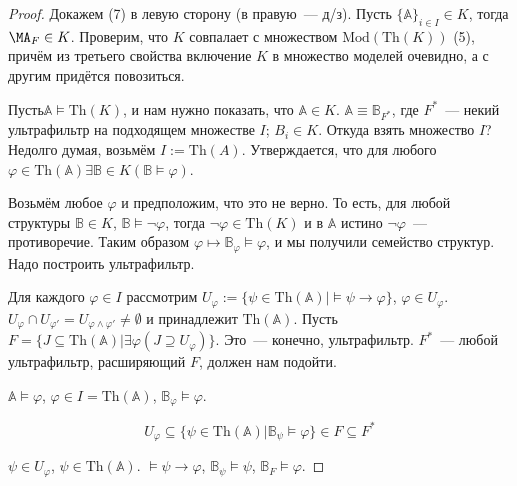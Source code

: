 \begin{proof}
    Докажем (7) в левую сторону (в правую~— д/з). Пусть $\{\mathbb{A}\}_{i \in I} \in K$, тогда $\MA_F \in K$. Проверим, что $K$ совпалает с множеством $\text{Mod}(\text{Th}(K))$ (5), причём из третьего свойства включение $K$ в множество моделей очевидно, а с другим придётся повозиться. \ 
    
    Пусть$\mathbb{A}\models \text{Th}(K)$, и нам нужно показать, что $\mathbb{A}\in K$. $\mathbb{A}\equiv \mathbb{B}_{F^*}$, где $F^*$~— некий ультрафильтр на подходящем множестве $I$; $B_i \in K$. Откуда взять множество $I$? Недолго думая, возьмём $I:= \text{Th}(A)$. Утверждается, что для любого $\varphi \in \text{Th}(\mathbb{A}) \exists \mathbb{B} \in K (\mathbb{B} \models \varphi)$. \ 

    Возьмём любое $\varphi$ и предположим, что это не верно. То есть, для любой структуры $\mathbb{B} \in K$, $\mathbb{B} \models \neg \varphi$, тогда $\neg \varphi \in \text{Th}(K)$ и в $\mathbb{A}$ истино $\neg \varphi$~— противоречие. Таким образом $\varphi \mapsto \mathbb{B}_\varphi \models \varphi$, и мы получили семейство структур. Надо построить ультрафильтр. \ 
    
    Для каждого $\varphi \in I$ рассмотрим $U_{\varphi} := \{\psi \in \text{Th}(\mathbb{A}) | \models \psi \rightarrow \varphi\}$, $\varphi \in U_\varphi$. $U_{\varphi} \cap U_{\varphi'} = U_{\varphi \wedge \varphi'} \neq \emptyset$ и принадлежит $\text{Th}(\mathbb{A})$. Пусть $F = \{J \subseteq \text{Th}(\mathbb{A}) | \exists \varphi (J \supseteq U_\varphi)\}$. Это~—  конечно, ультрафильтр. $F^*$~— любой ультрафильтр, расширяющий $F$, должен нам подойти. \ 

    $\mathbb{A}\models \varphi$, $\varphi \in I = \text{Th}(\mathbb{A})$, $\mathbb{B}_\varphi \models \varphi$. 

    \[ 
        U_{\varphi} \subseteq \{\psi \in \text{Th}(\mathbb{A}) | \mathbb{B}_{\psi} \models \varphi\} \in F \subseteq F^*
    \]
    
    $\psi \in U_{\varphi}$, $\psi \in \text{Th}(\mathbb{A})$. $\models \psi \rightarrow \varphi$, $\mathbb{B}_\psi \models \psi$, $\mathbb{B}_F \models \varphi$. 
\end{proof}

